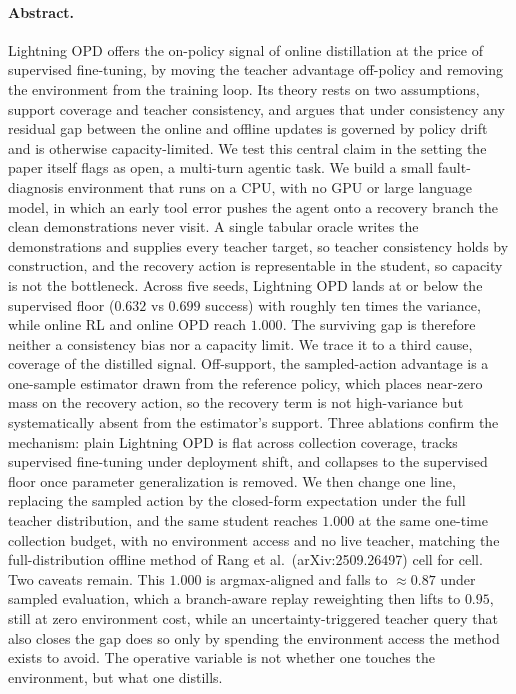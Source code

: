 \documentclass[11pt]{article}
\begin{document}
\paragraph{Abstract.}
Lightning OPD offers the on-policy signal of online distillation at the price of
supervised fine-tuning, by moving the teacher advantage off-policy and removing the
environment from the training loop. Its theory rests on two assumptions, support
coverage and teacher consistency, and argues that under consistency any residual
gap between the online and offline updates is governed by policy drift and is otherwise
capacity-limited. We test this central claim in the setting the paper itself flags as
open, a multi-turn agentic task. We build a small fault-diagnosis environment that
runs on a CPU, with no GPU or large language model, in which an early tool error pushes
the agent onto a recovery branch the clean demonstrations never visit. A single tabular
oracle writes the demonstrations and supplies every teacher target, so teacher
consistency holds by construction, and the recovery action is representable in the
student, so capacity is not the bottleneck. Across five seeds, Lightning OPD lands
at or below the supervised floor ($0.632$ vs $0.699$ success) with roughly ten
times the variance, while online RL and online OPD reach $1.000$. The surviving gap is
therefore neither a consistency bias nor a capacity limit. We trace it to a third
cause, coverage of the distilled signal. Off-support, the sampled-action advantage
is a one-sample estimator drawn from the reference policy, which places near-zero mass
on the recovery action, so the recovery term is not high-variance but systematically
absent from the estimator's support. Three ablations confirm the mechanism: plain
Lightning OPD is flat across collection coverage, tracks supervised fine-tuning under
deployment shift, and collapses to the supervised floor once parameter generalization
is removed. We then change one line, replacing the sampled action by the closed-form
expectation under the full teacher distribution, and the same student reaches
$1.000$ at the same one-time collection budget, with no environment access and no live
teacher, matching the full-distribution offline method of Rang et al.\
(arXiv:2509.26497) cell for cell. Two caveats remain. This $1.000$ is
argmax-aligned and falls to $\approx 0.87$ under sampled evaluation, which a
branch-aware replay reweighting then lifts to $0.95$, still at zero environment cost,
while an uncertainty-triggered teacher query that also closes the gap does so only
by spending the environment access the method exists to avoid. The operative variable
is not whether one touches the environment, but what one distills.
\end{document}
